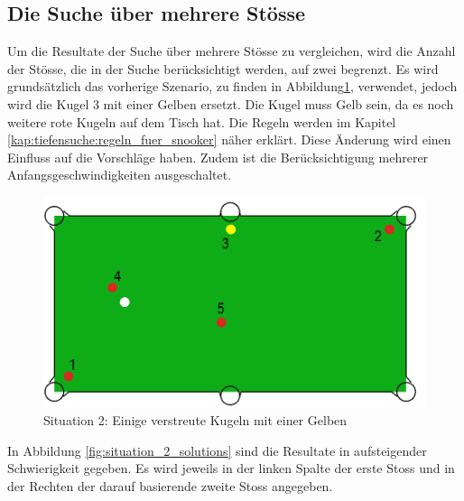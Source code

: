 \clearpage
\subsection{Die Suche über mehrere Stösse}
Um die Resultate der Suche über mehrere Stösse zu vergleichen, wird die Anzahl der Stösse, die in der Suche
berücksichtigt werden, auf zwei begrenzt.
Es wird grundsätzlich das vorherige Szenario, zu finden in Abbildung\ref{fig:search_situation_2}, verwendet,
jedoch wird die Kugel 3 mit einer Gelben ersetzt.
Die Kugel muss Gelb sein, da es noch weitere rote Kugeln auf dem Tisch hat.
Die Regeln werden im Kapitel \ref{kap:tiefensuche:regeln_fuer_snooker} näher erklärt.
Diese Änderung wird einen Einfluss auf die Vorschläge haben.
Zudem ist die Berücksichtigung mehrerer Anfangsgeschwindigkeiten ausgeschaltet.

%
%
\begin{figure}[h!]
    \begin{center}
        \includegraphics[width=0.4\linewidth]{../common/04_results/resources/simple_search/situation_diverse_deep_search.PNG}
    \end{center}
    \caption{Situation 2: Einige verstreute Kugeln mit einer Gelben}
    \label{fig:search_situation_2}
\end{figure}

In Abbildung \ref{fig:situation_2_solutions} sind die Resultate in aufsteigender Schwierigkeit gegeben. Es wird
jeweils in der linken Spalte der erste Stoss und in der Rechten der darauf basierende zweite Stoss angegeben.

